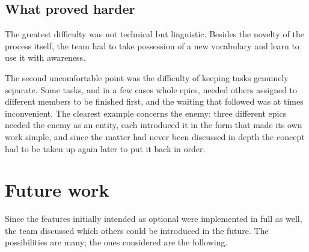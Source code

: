 \subsection{What proved harder}

The greatest difficulty was not technical but linguistic. Besides the novelty of the process itself, the team had to
take possession of a new vocabulary and learn to use it with awareness.

The second uncomfortable point was the difficulty of keeping tasks genuinely separate. Some tasks, and in a few cases
whole epics, needed others assigned to different members to be finished first, and the waiting that followed was at
times inconvenient. The clearest example concerns the enemy: three different epics needed the enemy as an entity, each
introduced it in the form that made its own work simple, and since the matter had never been discussed in depth the
concept had to be taken up again later to put it back in order.

\section{Future work}

Since the features initially intended as optional were implemented in full as well, the team discussed which others
could be introduced in the future. The possibilities are many; the ones considered are the following.

